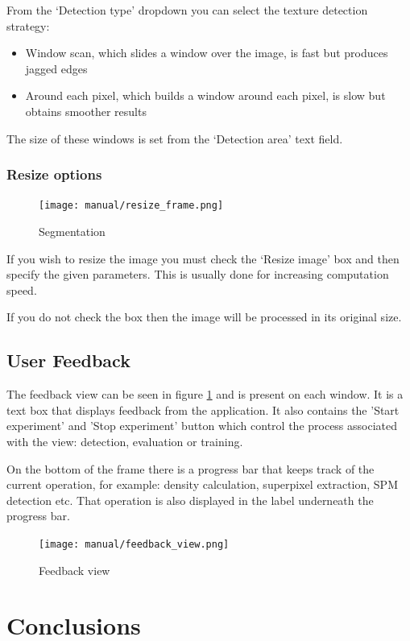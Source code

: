 \documentclass[12pt]{report}
\begin{document}
	From the ‘Detection type’ dropdown you can select the texture detection strategy:
	\begin{itemize}
		\item Window scan, which slides a window over the image, is fast but produces jagged edges
		\item Around each pixel, which builds a window around each pixel, is slow but obtains smoother results
	\end{itemize}
	
	The size of these windows is set from the ‘Detection area’ text field.
	
	\subsection{Resize options}
	
	\begin{figure}
		\begin{center}
			\texttt{[image: manual/resize\_frame.png]}
		\end{center}
		\caption{Segmentation}
	\end{figure}

	If you wish to resize the image you must check the ‘Resize image’ box and then specify the given parameters. This is usually done for increasing computation speed.
	
	If you do not check the box then the image will be processed in its original size.
	
	\section{User Feedback}
	
	The feedback view can be seen in figure \ref{feedback_view} and is present on each window. It is a text box that displays feedback from the application. It also contains the 'Start experiment' and 'Stop experiment' button which control the process associated with the view: detection, evaluation or training.
	
	On the bottom of the frame there is a progress bar that keeps track of the current operation, for example: density calculation, superpixel extraction, SPM detection etc. That operation is also displayed in the label underneath the progress bar.
	
	
	\begin{figure}[h!]
		\centering
		\texttt{[image: manual/feedback\_view.png]}
		\caption{Feedback view}
		\label{feedback_view}
	\end{figure}
	
	\chapter{Conclusions}
	
	\newpage
	
	
\end{document}
